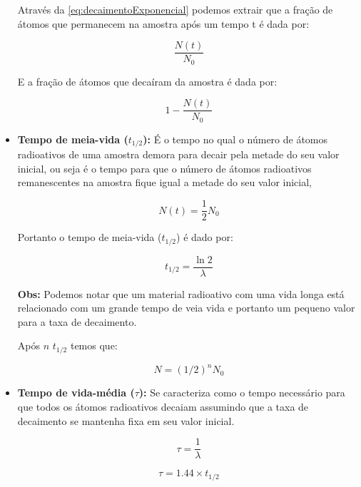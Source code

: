 \documentclass[11pt,a4paper]{article}
\begin{document}
\begin{itemize}
				Através da   \ref{eq:decaimentoExponencial} podemos extrair que a fração de átomos que permanecem na amostra após um tempo t é dada por:

				\begin{equation}
					\frac{N(t)}{N_0}
				\end{equation}

				E a fração de átomos que decaíram da amostra é dada por:

				\begin{equation}
					1 - \frac{N(t)}{N_0}
				\end{equation}

			\item \textbf{Tempo de meia-vida ($t_{1/2}$): } É o tempo no qual o número de átomos radioativos de uma amostra demora para decair pela metade do seu valor inicial, ou seja é o tempo para que o número de átomos radioativos remanescentes na amostra fique igual a metade do seu valor inicial, 
			
				\begin{equation}
					N(t) = \frac{1}{2}N_0
				\end{equation}

				Portanto o tempo de meia-vida  ($t_{1/2}$) é dado por:

				\begin{equation}
					t_{1/2} = \frac{\ln 2}{\lambda}
				\end{equation}

				\textbf{\textcolor{CarnationPink}{Obs:} } Podemos notar que um material radioativo com uma vida longa está relacionado com um grande tempo de veia vida e portanto um pequeno valor para a taxa de decaimento.

				Após $n$ $t_{1/2}$ temos que:

				\begin{equation}
					N = \left({1/2}\right)^n N_0
				\end{equation}

			\item \textbf{Tempo de vida-média ($\tau$): } Se caracteriza como o tempo necessário para que todos os átomos radioativos decaiam assumindo que a taxa de decaimento se mantenha fixa em seu valor inicial.
			
				\begin{equation}
					\tau = \frac{1}{\lambda}
				\end{equation}

				\begin{equation}
					\tau = 1.44 \times t_{1/2}
				\end{equation}


\end{itemize}
\end{document}
